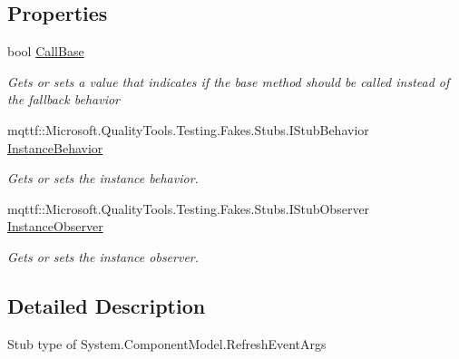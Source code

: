 \subsection*{Properties}
\begin{DoxyCompactItemize}
\item 
bool \hyperlink{class_system_1_1_component_model_1_1_fakes_1_1_stub_refresh_event_args_ac250e0ffe65425ed736c77d36156387f}{Call\-Base}
\begin{DoxyCompactList}\small\item\em Gets or sets a value that indicates if the base method should be called instead of the fallback behavior\end{DoxyCompactList}\item 
mqttf\-::\-Microsoft.\-Quality\-Tools.\-Testing.\-Fakes.\-Stubs.\-I\-Stub\-Behavior \hyperlink{class_system_1_1_component_model_1_1_fakes_1_1_stub_refresh_event_args_a5089108151ec63b969c0f353d72956e3}{Instance\-Behavior}
\begin{DoxyCompactList}\small\item\em Gets or sets the instance behavior.\end{DoxyCompactList}\item 
mqttf\-::\-Microsoft.\-Quality\-Tools.\-Testing.\-Fakes.\-Stubs.\-I\-Stub\-Observer \hyperlink{class_system_1_1_component_model_1_1_fakes_1_1_stub_refresh_event_args_ad1357ebd0deed00f5ad7ddbb3bbc4a38}{Instance\-Observer}
\begin{DoxyCompactList}\small\item\em Gets or sets the instance observer.\end{DoxyCompactList}\end{DoxyCompactItemize}


\subsection{Detailed Description}
Stub type of System.\-Component\-Model.\-Refresh\-Event\-Args



